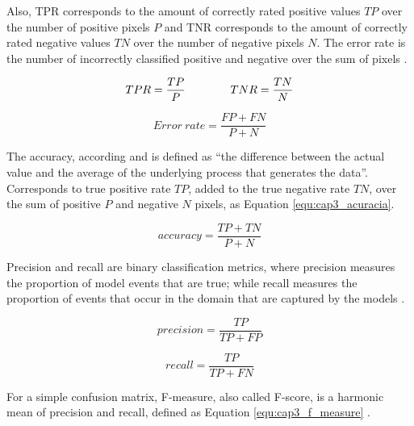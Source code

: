 Also, \ac{TPR} corresponds to the amount of correctly rated positive values $TP$ over the number of positive pixels $P$ and  
\ac{TNR} corresponds to the amount of correctly rated negative values $TN$ over the number of negative pixels $N$. 
The error rate is the number of incorrectly classified positive and negative over the sum of pixels \cite{Guo:2012}.

\begin{equation}
  \centering
  \label{equ:cap3_true_rate}
  \begin{aligned}
    TPR = \frac{TP}{P} \qquad\qquad
    TNR = \frac{TN}{N} 
  \end{aligned}
\end{equation}

\begin{equation}
  Error~rate = \frac{FP+FN}{P + N}
  \label{equ:cap3_error_rate}
\end{equation}

The accuracy, according  and  is defined as ``the difference between the actual value and the average of the underlying process that generates the data''. 
Corresponds to true positive rate $TP$, added to the true negative rate $TN$, over the sum of positive $P$ and negative $N$ pixels, as Equation \ref{equ:cap3_acuracia}.

\begin{equation}
  accuracy = \frac{TP+TN}{P+N}
  \label{equ:cap3_acuracia}
\end{equation}

Precision and recall are binary classification metrics, where precision measures the proportion of model events that are true; while recall measures the proportion of events that occur in the domain that are captured by the models \cite{TorgoRibeiro:2009} \cite{Fawcett:2006}. 

\begin{equation}
  precision = \frac{TP}{TP+FP}
\end{equation}

\begin{equation}
  recall = \frac{TP}{TP+FN}
  \label{equ:cap3_recall}
\end{equation}

For a simple confusion matrix, F-measure, also called F-score, is a harmonic mean of precision and recall, defined as Equation \ref {equ:cap3_f_measure} \cite{Fawcett:2006}.

